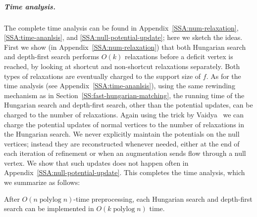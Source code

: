 \documentclass[a4paper,UKenglish]{socg-lipics-v2018}
\def\polylog{\mathop{\mathrm{polylog}}}
\theoremstyle{plain}
\numberwithin{figure}{section}
\renewcommand{\paragraph}{\subparagraph}
\begin{document}



\paragraph{Time analysis.}
The complete time analysis can be found in Appendix~\ref{SSA:num-relaxation}, \ref{SSA:time-ananlsis}, and \ref{SSA:null-potential-update}; here we sketch the ideas.
%
First we show (in Appendix~\ref{SSA:num-relaxation}) that both Hungarian search and depth-first search performs $O(k)$ relaxations before a deficit vertex is reached, by looking at shortcut and non-shortcut relaxations separately.  Both types of relaxations are eventually charged to the support size of $f$.
%
As for the time analysis (see Appendix~\ref{SSA:time-ananlsis}), using the same rewinding mechanism as in Section~\ref{SS:fast-hungarian-matching}, the running time of the Hungarian search and depth-first search, other than the potential updates, can be charged to the number of relaxations.
Again using the trick by Vaidya~\cite{Vaidya89}
we can charge the potential updates of normal vertices to the number of relaxations in the Hungarian search.
%
We never explicitly maintain the potentials on the null vertices; instead they are reconstructed whenever needed, either at the end of each iteration of refinement or when an augmentation sends flow through a null vertex.  We show that such updates does not happen often in Appendix~\ref{SSA:null-potential-update}.
%
This completes the time analysis, which we summarize as follows:

\begin{lemma}
After $O(n \polylog n)$-time preprocessing,
each Hungarian search and depth-first search can be implemented in $O(k \polylog n)$ time.
\end{lemma}
\end{document}
